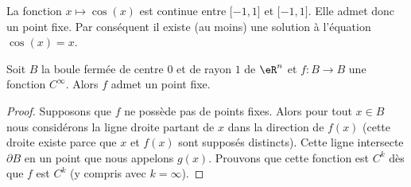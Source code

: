 \begin{example}
    La fonction \( x\mapsto\cos(x)\) est continue entre \( \mathopen[ -1 , 1 \mathclose]\) et \( \mathopen[ -1 , 1 \mathclose]\). Elle admet donc un point fixe. Par conséquent il existe (au moins) une solution à l'équation \( \cos(x)=x\).
\end{example}

\begin{proposition}     \label{PropDRpYwv}
    Soit \( B\) la boule fermée de centre \( 0\) et de rayon \( 1\) de \( \eR^n\) et \( f\colon B\to B\) une fonction \(  C^{\infty}\). Alors \( f\) admet un point fixe.
\end{proposition}

\begin{proof}
    Supposons que \( f\) ne possède pas de points fixes. Alors pour tout \( x\in B\) nous considérons la ligne droite partant de \( x\) dans la direction de \( f(x)\) (cette droite existe parce que \( x\) et \( f(x)\) sont supposés distincts). Cette ligne intersecte \( \partial B\) en un point que nous appelons \( g(x)\). Prouvons que cette fonction est \( C^k\) dès que \( f\) est \( C^k\) (y compris avec \( k=\infty\)).


\end{proof}
